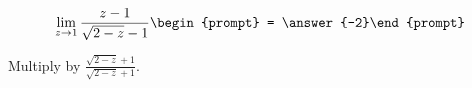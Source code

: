 \documentclass{ximera}
\author{Bart Snapp}
\begin{document}
\begin{exercise}

\[
\lim_{z\to 1 } \frac{z-1}{\sqrt{2-z}-1}\begin{prompt} = \answer{-2}\end{prompt}
\]
\begin{hint}
Multiply by $\frac{\sqrt{2-z}+1}{\sqrt{2-z}+1}$.
\end{hint}
\end{exercise}
\end{document}
